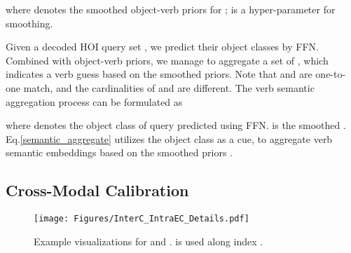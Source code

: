 \documentclass[letterpaper]{article} \usepackage{aaai22}  \usepackage{times}  \usepackage{helvet}  \usepackage{courier}  \usepackage[hyphens]{url}  \usepackage{graphicx} \urlstyle{rm} \def\UrlFont{\rm}  \usepackage{natbib}  \usepackage{caption} \DeclareCaptionStyle{ruled}{labelfont=normalfont,labelsep=colon,strut=off} \frenchspacing  \setlength{\pdfpagewidth}{8.5in}  \setlength{\pdfpageheight}{11in}  \usepackage{algorithm}
\begin{document}
where  denotes the smoothed object-verb priors for ;  is a hyper-parameter for smoothing.

Given a decoded HOI query set , we predict their object classes by FFN. Combined with object-verb priors, we manage to aggregate a set of , which indicates a verb guess based on the smoothed priors. Note that  and  are one-to-one match, and the cardinalities of  and  are different. The verb semantic aggregation process can be formulated as

where  denotes the object class of query  predicted using FFN.  is the smoothed . Eq.\ref{semantic_aggregate} utilizes the object class as a cue, to aggregate verb semantic embeddings based on the smoothed priors . 





\subsection{Cross-Modal Calibration}
\begin{figure}[t]
\centering
\texttt{[image: Figures/InterC\_IntraEC\_Details.pdf]} 
\caption{Example visualizations for  and .  is used along index .}
\label{Module_visualization}
\end{figure}
\end{document}
